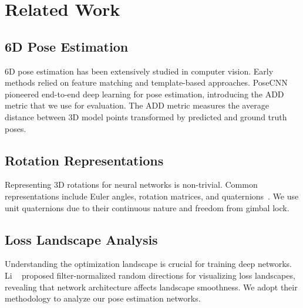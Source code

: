 \section{Related Work}
\label{sec:related}

\subsection{6D Pose Estimation}
6D pose estimation has been extensively studied in computer vision. Early methods relied on feature matching and template-based approaches. PoseCNN~\cite{xiang2018posecnn} pioneered end-to-end deep learning for pose estimation, introducing the ADD metric that we use for evaluation. The ADD metric measures the average distance between 3D model points transformed by predicted and ground truth poses.

\subsection{Rotation Representations}
Representing 3D rotations for neural networks is non-trivial. Common representations include Euler angles, rotation matrices, and quaternions~\cite{shoemake1985animating}. We use unit quaternions due to their continuous nature and freedom from gimbal lock.

\subsection{Loss Landscape Analysis}
Understanding the optimization landscape is crucial for training deep networks. Li \etal~\cite{visualloss} proposed filter-normalized random directions for visualizing loss landscapes, revealing that network architecture affects landscape smoothness. We adopt their methodology to analyze our pose estimation networks.
